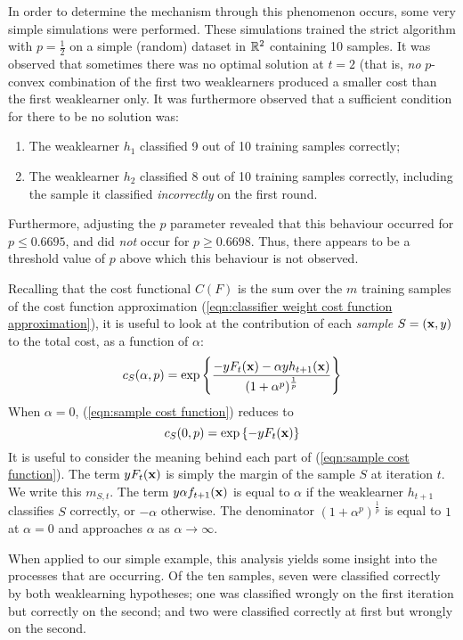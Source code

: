 In order to determine the mechanism through this phenomenon occurs,
some very simple simulations were performed.  These simulations
trained the strict algorithm with $p = \frac{1}{2}$ on a simple
(random) dataset in $\mathbb{R}^2$ containing 10 samples.  It was observed
that sometimes there was no optimal solution at $t=2$ (that is, 
\emph{no} $p$-convex combination of the first two weaklearners produced a
smaller cost than the first weaklearner only.  It was furthermore
observed that a sufficient condition for there to be no solution was:
%
\begin{enumerate}
\item	The weaklearner $h_1$ classified 9 out of 10 training samples
	correctly; 
\item	The weaklearner $h_2$ classified 8 out of 10 training samples
	correctly, including the sample it classified
	\emph{incorrectly} on the first round.
\end{enumerate}
%
Furthermore, adjusting the $p$ parameter revealed that this behaviour
occurred for $p \leq 0.6695$, and did \emph{not} occur for $p \geq
0.6698$.  Thus, there appears to be a threshold value of $p$ above
which this behaviour is not observed.

Recalling that the cost functional $C(F)$ is the sum over the $m$
training samples of the cost function approximation
(\ref{eqn:classifier weight cost function approximation}), it is
useful to look at the contribution of each \emph{sample} $S = (\mathbf{x},
y)$ to the total cost, as a function of $\alpha$:
%
\begin{equation}
\label{eqn:sample cost function}
c_S(\alpha, p) = \exp \left\{ \frac{-y F_t(\mathbf{x}) - \alpha y h_{t+1}
(\mathbf{x})}{(1 + \alpha^p)^{\frac{1}{p}}} \right\}
\end{equation}
%
When $\alpha = 0$, (\ref{eqn:sample cost function}) reduces to
%
\begin{equation}
c_S(0, p) = \exp \left\{ -y F_t(\mathbf{x}) \right\}
\end{equation}
%
It is useful to consider the meaning behind each part of
(\ref{eqn:sample cost function}).  The term $y F_t(\mathbf{x})$ is simply
the margin of the sample $S$ at iteration $t$.  We write this $m_{S,
t}$.  The term $y \alpha f_{t+1}(\mathbf{x})$ is equal to $\alpha$ if the
weaklearner $h_{t+1}$ classifies $S$ correctly, or $-\alpha$
otherwise.  The denominator $(1 + \alpha^p)^{\frac{1}{p}}$ is equal to
$1$ at $\alpha=0$ and approaches $\alpha$ as $\alpha \rightarrow
\infty$.

When applied to our simple example, this analysis yields some
insight into the processes that are occurring.  Of the ten samples,
seven were classified correctly by both weaklearning hypotheses; one
was classified wrongly on the first iteration but correctly on the
second; and two were classified correctly at first but wrongly on the
second.

